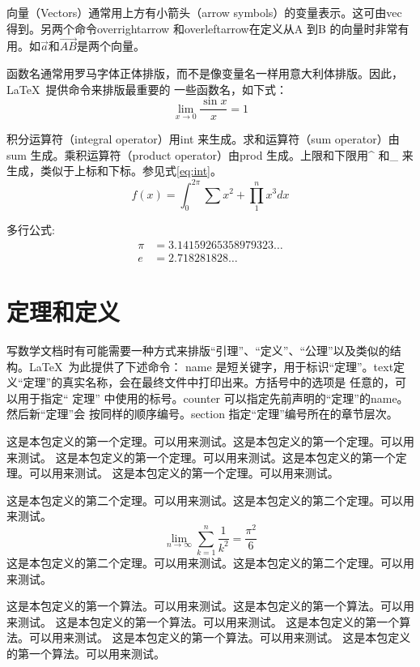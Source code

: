 向量（Vectors）通常用上方有小箭头（arrow symbols）的变量表示。这可由vec 得到。另两个命令overrightarrow 和overleftarrow在定义从A 到B 的向量时非常有用。如$\vec{a}$和$\overrightarrow{AB}$是两个向量。

函数名通常用罗马字体正体排版，而不是像变量名一样用意大利体排版。因此，\LaTeX{}~提供命令来排版最重要的
一些函数名，如下式：
\begin{equation}\label{eq:sin}
    \lim_{x \to 0} \frac{\sin x}{x} = 1
\end{equation}

积分运算符（integral operator）用int 来生成。求和运算符（sum operator）由sum 生成。乘积运算符（product operator）由prod 生成。上限和下限用\^{} 和\_ 来生成，类似于上标和下标。参见式\eqref{eq:int}。
\begin{equation}
 \label{eq:int}
    f(x) = \int_0^{2\pi}{\sum x^2 + \prod_1^n x^3}dx
\end{equation}

多行公式:
\begin{align}
 \pi&= 3.14159265358979323\ldots \\   
  e &= 2.718281828\ldots
\end{align}

\section{定理和定义}
写数学文档时有可能需要一种方式来排版“引理”、“定义”、“公理”以及类似的结构。\LaTeX{}~为此提供了下述命令：
name 是短关键字，用于标识“定理”。text定义“定理”的真实名称，会在最终文件中打印出来。方括号中的选项是
任意的，可以用于指定“ 定理” 中使用的标号。counter 可以指定先前声明的“定理”的name。然后新“定理”会
按同样的顺序编号。section 指定“定理”编号所在的章节层次。
\begin{thm}
这是本包定义的第一个定理。可以用来测试。这是本包定义的第一个定理。可以用来测试。
这是本包定义的第一个定理。可以用来测试。这是本包定义的第一个定理。可以用来测试。
这是本包定义的第一个定理。可以用来测试。
\end{thm}

\begin{thm}
这是本包定义的第二个定理。可以用来测试。这是本包定义的第二个定理。可以用来测试。
\begin{equation}
    \lim_{n \to \infty} \sum_{k=1}^n \frac{1}{k^2} = \frac{\pi^2}{6}
\end{equation}
这是本包定义的第二个定理。可以用来测试。这是本包定义的第二个定理。可以用来测试。
\end{thm}

\begin{algo}
这是本包定义的第一个算法。可以用来测试。这是本包定义的第一个算法。可以用来测试。
这是本包定义的第一个算法。可以用来测试。
这是本包定义的第一个算法。可以用来测试。
这是本包定义的第一个算法。可以用来测试。
这是本包定义的第一个算法。可以用来测试。

\end{algo}





